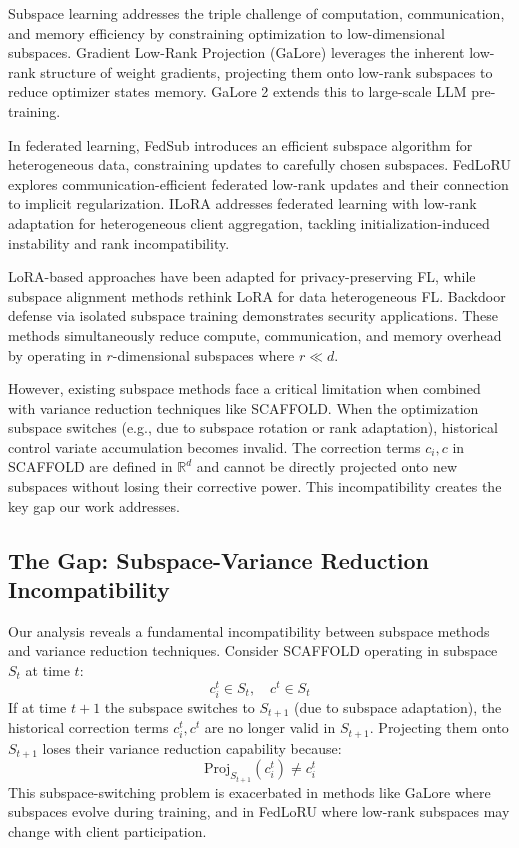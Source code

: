 Subspace learning addresses the triple challenge of computation, communication, and memory efficiency by constraining optimization to low-dimensional subspaces. Gradient Low-Rank Projection (GaLore) \cite{zhao2024galore} leverages the inherent low-rank structure of weight gradients, projecting them onto low-rank subspaces to reduce optimizer states memory. GaLore 2 \cite{su2025galore2} extends this to large-scale LLM pre-training.

In federated learning, FedSub \cite{zhang2025fedsub} introduces an efficient subspace algorithm for heterogeneous data, constraining updates to carefully chosen subspaces. FedLoRU \cite{park2024fedlru} explores communication-efficient federated low-rank updates and their connection to implicit regularization. ILoRA \cite{zhou2025ilora} addresses federated learning with low-rank adaptation for heterogeneous client aggregation, tackling initialization-induced instability and rank incompatibility.

LoRA-based approaches \cite{sun2024improvinglora} have been adapted for privacy-preserving FL, while subspace alignment methods \cite{peng2026subspacealignment} rethink LoRA for data heterogeneous FL. Backdoor defense via isolated subspace training \cite{huang2023lockdown} demonstrates security applications. These methods simultaneously reduce compute, communication, and memory overhead by operating in $r$-dimensional subspaces where $r \ll d$.

However, existing subspace methods face a critical limitation when combined with variance reduction techniques like SCAFFOLD. When the optimization subspace switches (e.g., due to subspace rotation or rank adaptation), historical control variate accumulation becomes invalid. The correction terms $c_i, c$ in SCAFFOLD are defined in $\mathbb{R}^d$ and cannot be directly projected onto new subspaces without losing their corrective power. This incompatibility creates the key gap our work addresses.

\subsection{The Gap: Subspace-Variance Reduction Incompatibility}

Our analysis reveals a fundamental incompatibility between subspace methods and variance reduction techniques. Consider SCAFFOLD operating in subspace $S_t$ at time $t$:
\[
c_i^{t} \in S_t, \quad c^{t} \in S_t
\]
If at time $t+1$ the subspace switches to $S_{t+1}$ (due to subspace adaptation), the historical correction terms $c_i^{t}, c^{t}$ are no longer valid in $S_{t+1}$. Projecting them onto $S_{t+1}$ loses their variance reduction capability because:
\[
\text{Proj}_{S_{t+1}}(c_i^{t}) \neq c_i^{t}
\]
This subspace-switching problem is exacerbated in methods like GaLore where subspaces evolve during training, and in FedLoRU where low-rank subspaces may change with client participation.

